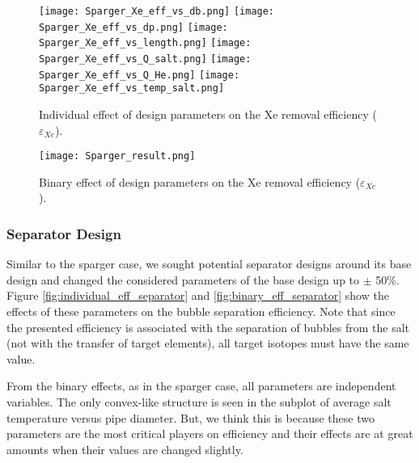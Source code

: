     \begin{figure}[htbp!]
        \begin{center}
            \texttt{[image: Sparger\_Xe\_eff\_vs\_db.png]}
            \texttt{[image: Sparger\_Xe\_eff\_vs\_dp.png]}
            \texttt{[image: Sparger\_Xe\_eff\_vs\_length.png]}
            \texttt{[image: Sparger\_Xe\_eff\_vs\_Q\_salt.png]}
            \texttt{[image: Sparger\_Xe\_eff\_vs\_Q\_He.png]}
            \texttt{[image: Sparger\_Xe\_eff\_vs\_temp\_salt.png]}
        \end{center}
        \caption{Individual effect of design parameters on the Xe removal efficiency ($\varepsilon$$_{Xe}$).}
        \label{fig:individual_eff_sparger}
    \end{figure}

    \begin{figure}[htbp!]
        \begin{center}
            \texttt{[image: Sparger\_result.png]}
        \end{center}
        \caption{Binary effect of design parameters on the Xe removal efficiency ($\varepsilon$$_{Xe}$).}
        \label{fig:binary_eff_sparger}
    \end{figure}

\newpage
\FloatBarrier

\subsubsection{Separator Design}

    Similar to the sparger case, we sought potential separator designs around its base design and changed the considered parameters of the base design up to $\pm$ 50\%. Figure \ref{fig:individual_eff_separator} and \ref{fig:binary_eff_separator} show the effects of these parameters on the bubble separation efficiency. Note that since the presented efficiency is associated with the separation of bubbles from the salt (not with the transfer of target elements), all target isotopes must have the same value.

    From the binary effects, as in the sparger case, all parameters are independent variables. The only convex-like structure is seen in the subplot of average salt temperature versus pipe diameter. But, we think this is because these two parameters are the most critical players on efficiency and their effects are at great amounts when their values are changed slightly.


